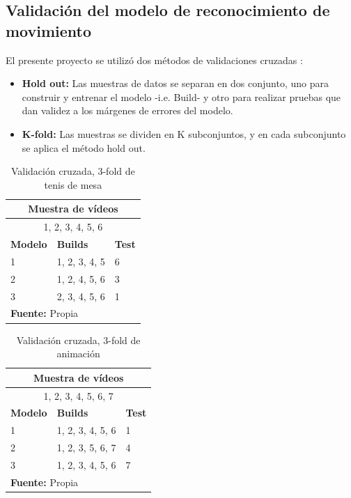 \subsection{Validaci\'on del modelo de reconocimiento de movimiento}\label{dis:validate}
El presente proyecto se utiliz\'o dos m\'etodos de validaciones cruzadas \cite{perez2015analisis}:
\begin{itemize}
\item \textbf{Hold out:} Las muestras de datos se separan en dos conjunto, uno para construir y entrenar el modelo -i.e. Build- y otro para realizar pruebas que dan validez a los m\'argenes  de errores del modelo.
\item \textbf{K-fold:} Las muestras se dividen en K subconjuntos, y en cada subconjunto se aplica el m\'etodo hold out.
\end{itemize}  
\begin{table}[H]
\begin{center}
\caption{Validaci\'on cruzada, 3-fold de tenis de mesa}
\label{tab:KfoldTenis}
\begin{tabular}{|l|l|l|}
\hline
\multicolumn{3}{|c|}{\textbf{Muestra de v\'ideos}} \\ \hline
\multicolumn{3}{|c|}{1, 2, 3, 4, 5, 6} \\ \hline
\textbf{Modelo} & \textbf{Builds} & \textbf{Test} \\ \hline
1 & 1, 2, 3, 4, 5 & 6 \\ \hline
2 & 1, 2, 4, 5, 6 & 3 \\ \hline
3 & 2, 3, 4, 5, 6 & 1 \\ \hline
\multicolumn{3}{l}{\textbf{Fuente:} Propia}
\end{tabular}
\end{center}
\end{table}
\begin{table}[H]
\begin{center}
\caption{Validaci\'on cruzada, 3-fold de animaci\'on}
\label{tab:KfoldAnimacion}
\begin{tabular}{|l|l|l|}
\hline
\multicolumn{3}{|c|}{\textbf{Muestra de v\'ideos}} \\ \hline
\multicolumn{3}{|c|}{1, 2, 3, 4, 5, 6, 7} \\ \hline
\textbf{Modelo} & \textbf{Builds} & \textbf{Test} \\ \hline
1 & 1, 2, 3, 4, 5, 6 & 1 \\ \hline
2 & 1, 2, 3, 5, 6, 7 & 4 \\ \hline
3 & 1, 2, 3, 4, 5, 6 & 7 \\ \hline
\multicolumn{3}{l}{\textbf{Fuente:} Propia}
\end{tabular}
\end{center}
\end{table}
